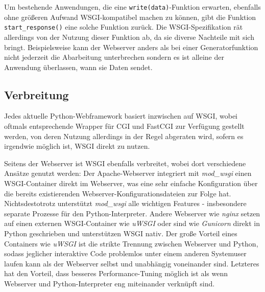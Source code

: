 Um bestehende Anwendungen, die eine \lstinline{write(data)}-Funktion erwarten, ebenfalls ohne
größeren Aufwand WSGI-kompatibel machen zu können, gibt die Funktion \lstinline{start_response()}
eine solche Funktion zurück. Die WSGI-Spezifikation rät allerdings von der Nutzung dieser Funktion
ab, da sie diverse Nachteile mit sich bringt. Beispielsweise kann der Webserver anders als bei einer
Generatorfunktion nicht jederzeit die Abarbeitung unterbrechen sondern es ist alleine der Anwendung
überlassen, wann sie Daten sendet.


\subsection{Verbreitung}

Jedes aktuelle Python-Webframework basiert inzwischen auf WSGI, wobei oftmals entsprechende Wrapper
für CGI und FastCGI zur Verfügung gestellt werden, von deren Nutzung allerdings in der Regel
abgeraten wird, sofern es irgendwie möglich ist, WSGI direkt zu nutzen.

Seitens der Webserver ist WSGI ebenfalls verbreitet, wobei dort verschiedene Ansätze genutzt werden:
Der Apache-Webserver integriert mit \emph{mod\_wsgi} einen WSGI-Container direkt im Webserver, was
eine sehr einfache Konfiguration über die bereits existierenden Webserver-Konfigurationsdateien zur
Folge hat. Nichtsdestotrotz unterstützt \emph{mod\_wsgi} alle wichtigen Features - insbesondere
separate Prozesse für den Python-Interpreter.
Andere Webserver wie \emph{nginx} setzen auf einen externen WSGI-Container wie \emph{uWSGI} oder
sind wie \emph{Gunicorn} direkt in Python geschrieben und unterstützen WSGI nativ.
Der große Vorteil eines Containers wie \emph{uWSGI} ist die strikte Trennung zwischen Webserver und
Python, sodass jeglicher interaktive Code problemlos unter einem anderen Systemuser laufen kann als
der Webserver selbst und unabhängig voneinander sind. Letzteres hat den Vorteil, dass besseres
Performance-Tuning möglich ist als wenn Webserver und Python-Interpreter eng miteinander verknüpft
sind.
